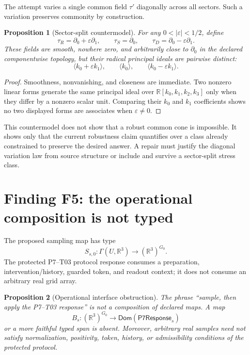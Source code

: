 \documentclass[11pt]{article}
\newtheorem{proposition}{Proposition}
\newcommand{\R}{\mathbb{R}}
\begin{document}
The attempt varies a single common field \(\tau'\) diagonally across all
sectors.  Such a variation preserves commonity by construction.

\begin{proposition}[Sector-split countermodel]
For any \(0<|\varepsilon|<1/2\), define
\[
 \tau_R=\partial_0+\varepsilon\partial_1,\qquad
 \tau_S=\partial_0,\qquad
 \tau_D=\partial_0-\varepsilon\partial_1.
\]
These fields are smooth, nowhere zero, and arbitrarily close to
\(\partial_0\) in the declared componentwise topology, but their radical
principal ideals are pairwise distinct:
\[
 \langle k_0+\varepsilon k_1\rangle,\qquad
 \langle k_0\rangle,\qquad
 \langle k_0-\varepsilon k_1\rangle.
\]
\end{proposition}

\begin{proof}
Smoothness, nonvanishing, and closeness are immediate.  Two nonzero linear
forms generate the same principal ideal over \(\R[k_0,k_1,k_2,k_3]\) only
when they differ by a nonzero scalar unit.  Comparing their \(k_0\) and
\(k_1\) coefficients shows no two displayed forms are associates when
\(\varepsilon\neq0\).
\end{proof}

This countermodel does not show that a robust common cone is impossible.  It
shows only that the current robustness claim quantifies over a class already
constrained to preserve the desired answer.  A repair must justify the
diagonal variation law from source structure or include and survive a
sector-split stress class.

\section{Finding F5: the operational composition is not typed}

The proposed sampling map has type
\[
 S_{s,0}:\Gamma(U,\R^3)\longrightarrow(\R^3)^{G_0}.
\]
The protected P7--T03 protocol response consumes a preparation,
intervention/history, guarded token, and readout context; it does not consume
an arbitrary real grid array.

\begin{proposition}[Operational interface obstruction]
The phrase “sample, then apply the P7--T03 response” is not a composition of
declared maps.  A map
\[
 B_s:(\R^3)^{G_0}\longrightarrow \mathsf{Dom}(\mathsf{P7Response}_s)
\]
or a more faithful typed span is absent.  Moreover, arbitrary real samples
need not satisfy normalization, positivity, token, history, or admissibility
conditions of the protected protocol.
\end{proposition}
\end{document}
